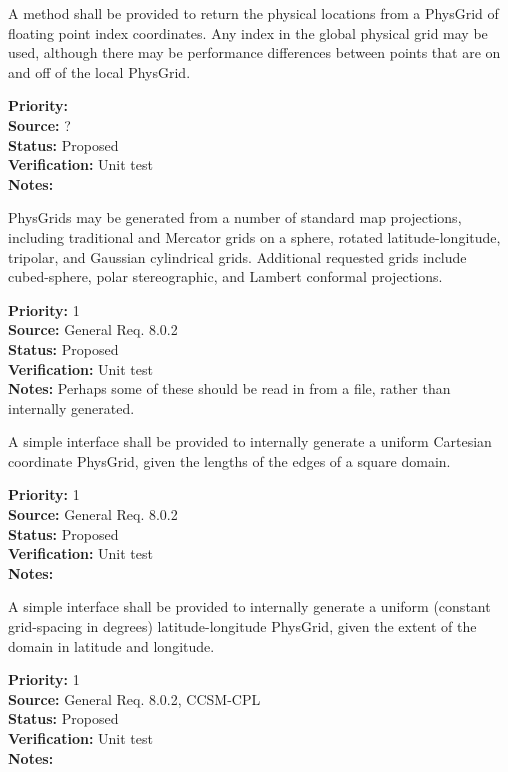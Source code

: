 A method shall be provided to return the physical locations from a PhysGrid of
floating point index coordinates.  Any index in the global physical grid may be
used, although there may be performance differences between points that are on
and off of the local PhysGrid.
\begin{reqlist}
{\bf Priority:} \\
{\bf Source:} ? \\
{\bf Status:} Proposed \\
{\bf Verification:} Unit test \\
{\bf Notes:} 
\end{reqlist}


PhysGrids may be generated from a number of standard map projections, including
traditional and Mercator grids on a sphere, rotated latitude-longitude,
tripolar, and Gaussian cylindrical grids.  Additional requested grids include 
cubed-sphere, polar stereographic, and Lambert conformal projections.
\begin{reqlist}
{\bf Priority:} 1 \\
{\bf Source:} General Req. 8.0.2 \\
{\bf Status:} Proposed \\
{\bf Verification:} Unit test\\
{\bf Notes:}  Perhaps some of these should be read in from a file, rather than
internally generated.
\end{reqlist}

A simple interface shall be provided to internally generate a uniform Cartesian
coordinate PhysGrid, given the lengths of the edges of a square domain.
\begin{reqlist}
{\bf Priority:} 1 \\
{\bf Source:} General Req. 8.0.2 \\
{\bf Status:} Proposed \\
{\bf Verification:} Unit test\\
{\bf Notes:} 
\end{reqlist}

A simple interface shall be provided to internally generate a uniform (constant
grid-spacing in degrees) latitude-longitude PhysGrid, given the extent of the domain
in latitude and longitude.                                                           
\begin{reqlist}
{\bf Priority:} 1 \\
{\bf Source:} General Req. 8.0.2, CCSM-CPL \\
{\bf Status:} Proposed \\
{\bf Verification:} Unit test\\
{\bf Notes:} 
\end{reqlist}


